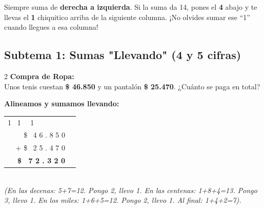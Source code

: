 \documentclass[12pt, letterpaper]{article}
\begin{document}
\begin{truco}{}
Siempre suma de \textbf{derecha a izquierda}. Si la suma da 14, pones el \textbf{4} abajo y te llevas el \textbf{1} chiquitico arriba de la siguiente columna. ¡No olvides sumar ese ``1'' cuando llegues a esa columna!
\end{truco}

\vspace{0.5cm}
\noindent\begin{minipage}{\textwidth}
\subsection*{Subtema 1: Sumas "Llevando" (4 y 5 cifras)}

\begin{ejemplo}
\begin{multicols}{2}
    \textbf{Compra de Ropa:}\\
    Unos tenis cuestan \textbf{\$ 46.850} y un pantalón \textbf{\$ 25.470}. ¿Cuánto se paga en total?

    \columnbreak

    \textbf{Alineamos y sumamos llevando:}\\
    \begin{tabular}{r@{\quad}l}
      \small \textcolor{valred}{1} \ \textcolor{valred}{1} \ \ \textcolor{valred}{1} \ \ \ \ \ \ \ \ & \\[-1ex]
      \$ \ 4 6 . 8 5 0 & \\
    + \$ \ 2 5 . 4 7 0 & \\
    \hline
      \textbf{\$ \ 7 2 . 3 2 0} & 
    \end{tabular}
    \\[0.2cm]
    \small \textit{(En las decenas: 5+7=12. Pongo 2, llevo 1. En las centenas: 1+8+4=13. Pongo 3, llevo 1. En los miles: 1+6+5=12. Pongo 2, llevo 1. Al final: 1+4+2=7).}
\end{multicols}
\end{ejemplo}
\end{minipage}
\end{document}
